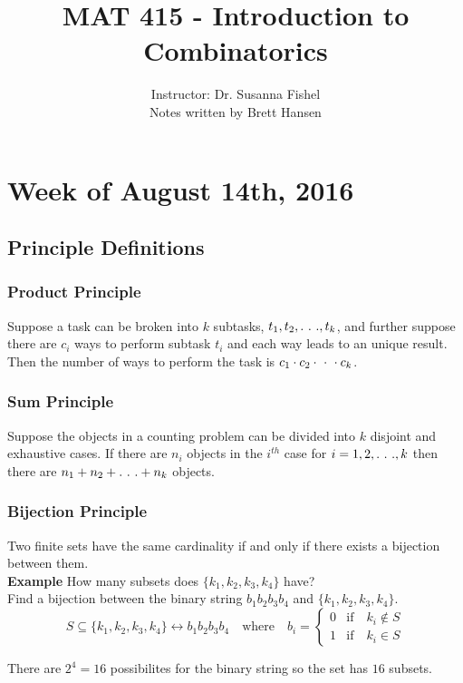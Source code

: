 \documentclass{article}
\title{MAT 415 - Introduction to Combinatorics}
\author{
{\Large Instructor: Dr. Susanna Fishel} \\
		Notes written by Brett Hansen
}
\date{}
\begin{document}
\maketitle
\tableofcontents
\break

\section{Week of August 14th, 2016}
\subsection{Principle Definitions}
\subsubsection{Product Principle}
Suppose a task can be broken into $k$ subtasks, $t_1,t_2,.\ .\ .,t_k$, and further suppose there are $c_i$ ways to perform subtask $t_i$ and each way leads to an unique result. Then the number of ways to perform the task is $c_1 \cdot c_2 \cdot\ \cdot\ \cdot c_k$.

\subsubsection{Sum Principle}
Suppose the objects in a counting problem can be divided into $k$ disjoint and exhaustive cases. If there are $n_i$ objects in the $i^{th}$ case for $i=1,2,.\ .\ .,k$ then there are $n_1+n_2+.\ .\ .+n_k$ objects.

\subsubsection{Bijection Principle}
Two finite sets have the same cardinality if and only if there exists a bijection between them. \\
\newline
\textbf{Example} \quad How many subsets does $\{k_1,k_2,k_3,k_4\}$ have? \\
Find a bijection between the binary string $b_1b_2b_3b_4$ and $\{k_1,k_2,k_3,k_4\}$. \\

$$S\subseteq\{k_1,k_2,k_3,k_4\}\longleftrightarrow b_1b_2b_3b_4 \quad\text{where}\quad b_i=
\begin{cases} 
	0 & \text{if}\quad k_i \notin S\\
	1 & \text{if}\quad k_i \in S
\end{cases}
$$

\noindent There are $2^4=16$ possibilites for the binary string so the set has $16$ subsets.
\end{document}
